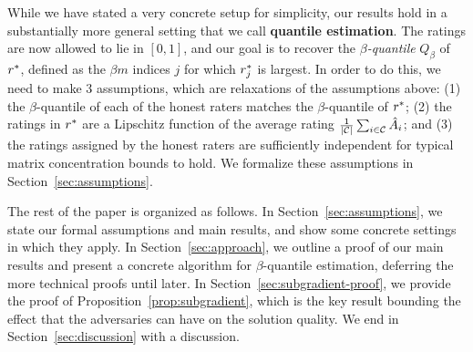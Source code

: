 While we have stated a very concrete setup for simplicity, our results 
hold in a substantially more general setting that we call \textbf{quantile 
estimation}. The ratings are now allowed to lie in $[0,1]$, and 
our goal is to recover the \emph{$\beta$-quantile} $Q_{\beta}$ of 
$r^*$, defined as the $\beta m$ indices $j$ for which $r^*_j$ is largest. 
In order to do this, we need to make $3$ assumptions, which are relaxations of 
the assumptions above: (1) the $\beta$-quantile of each of the honest raters 
matches the $\beta$-quantile of $r^*$; (2) the ratings in $r^*$ are a 
Lipschitz function of the average rating 
$\frac{1}{|\mathcal{C}|}\sum_{i \in \mathcal{C}} \hat{A}_i$; and (3) the ratings assigned by 
the honest raters are sufficiently independent for typical matrix 
concentration bounds to hold. We formalize these assumptions in 
Section~\ref{sec:assumptions}. 

The rest of the paper is organized as follows. In Section~\ref{sec:assumptions}, 
we state our formal assumptions and main results, and show some concrete 
settings in which they apply. In Section~\ref{sec:approach}, we outline a proof 
of our main results and present a concrete algorithm for $\beta$-quantile 
estimation, deferring the more technical proofs until later. 
In Section~\ref{sec:subgradient-proof}, we provide the proof of 
Proposition~\ref{prop:subgradient}, which is the key result bounding the effect 
that the adversaries can have on the solution quality. We end in 
Section~\ref{sec:discussion} with a discussion.
